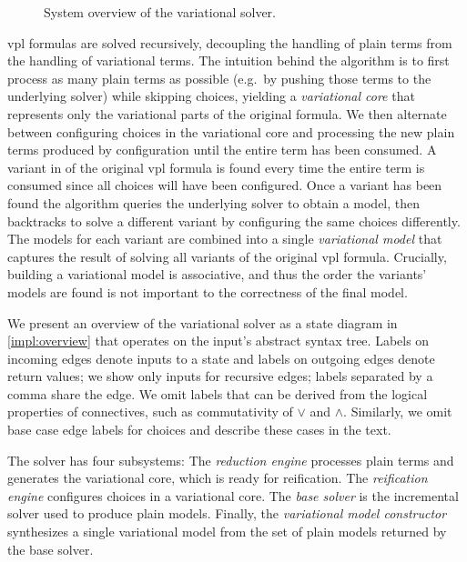 \label{section:vsat:approach}
%
\begin{figure}
  \centering
    
    \caption{System overview of the variational solver.}%
    \label{impl:overview}
\end{figure}

\ac{vpl} formulas are solved recursively, decoupling the handling of plain terms
from the handling of variational terms.
%
The intuition behind the algorithm is to first process as many plain terms as
possible (e.g.\ by pushing those terms to the underlying solver) while skipping
choices, yielding a \emph{variational core} that represents only the variational
parts of the original formula. We then alternate between configuring choices in
the variational core and processing the new plain terms produced by
configuration until the entire term has been consumed.
%
A variant in of the original \ac{vpl} formula is found every time the entire
term is consumed since all choices will have been configured. Once a variant has
been found the algorithm queries the underlying solver to obtain a model, then
backtracks to solve a different variant by configuring the same choices
differently. The models for each variant are combined into a single
\emph{variational model} that captures the result of solving all variants of the
original \ac{vpl} formula. Crucially, building a variational model is
associative, and thus the order the variants' models are found is not important
to the correctness of the final model.

We present an overview of the variational solver as a state diagram in
\autoref{impl:overview} that operates on the input's abstract syntax tree.
Labels on incoming edges denote inputs to a state and labels on outgoing edges
denote return values; we show only inputs for recursive edges; labels separated
by a comma share the edge. We omit labels that can be derived from the logical
properties of connectives, such as commutativity of $\vee$ and $\wedge$.
Similarly, we omit base case edge labels for choices and describe these cases
in the text.

The solver has four subsystems: The \emph{reduction engine} processes plain
terms and generates the variational core, which is ready for reification.
The \emph{reification engine} configures choices in a variational core. The
\textit{base solver} is the incremental solver used to produce plain models.
Finally, the \emph{variational model constructor} synthesizes a single
variational model from the set of plain models returned by the base solver.

